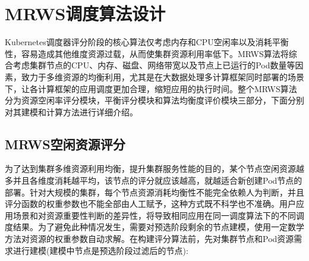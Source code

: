 \section{MRWS调度算法设计}
Kubernetes调度器评分阶段的核心算法仅考虑内存和CPU空闲率以及消耗平衡性，容易造成其他维度资源过载，从而使集群资源利用率低下。MRWS算法将综合考虑集群节点的CPU、内存、磁盘、网络带宽以及节点上已运行的Pod数量等因素，致力于多维资源的均衡利用，尤其是在大数据处理多计算框架同时部署的场景下，让各计算框架的应用调度更加合理，缩短应用的执行时间。整个MRWS算法分为资源空闲率评分模块，平衡评分模块和算法均衡度评价模块三部分，下面分别对其建模和计算方法进行详细介绍。

\subsection{MRWS空闲资源评分}
为了达到集群多维资源利用均衡，提升集群服务性能的目的，某个节点空闲资源越多并且各维度消耗越平均，该节点的评分就应该越高，就越适合新创建Pod节点的部署。针对大规模的集群，每个节点资源消耗均衡性不能完全依赖人为判断，并且评分函数的权重参数也不能全部由人工赋予，这种方式既不科学也不准确。用户应用场景和对资源重要性判断的差异性，将导致相同应用在同一调度算法下的不同调度结果。为了避免此种情况发生，需要对预选阶段剩余的节点建模，使用一定数学方法对资源的权重参数自动求解。在构建评分算法前，先对集群节点和Pod资源需求进行建模(建模中节点是预选阶段过滤后的节点):
